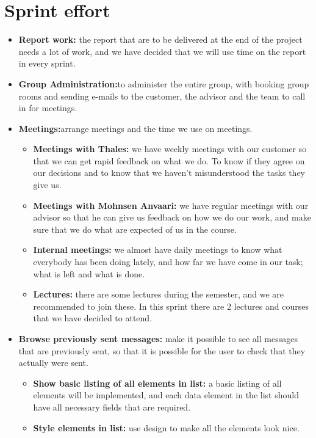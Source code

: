 \section{Sprint effort}

\begin{itemize}
\item{}\textbf{Report work:} the report that are to be delivered at the end of the project needs a lot of work, and we have decided that we will use time on the report in every sprint.
\item{}\textbf{Group Administration:}to administer the entire group, with booking group rooms and sending e-mails to the customer, the advisor and the team to call in for meetings.
\item{}\textbf{Meetings:}arrange meetings and the time we use on meetings.
\begin{itemize}
\item{}\textbf{Meetings with Thales:} we have weekly meetings with our customer so that we can get rapid feedback on what we do. To know if they agree on our decisions and to know that we haven’t misunderstood the tasks they give us.
\item{}\textbf{Meetings with Mohnsen Anvaari:} we have regular meetings with our advisor so that he can give us feedback on how we do our work, and make sure that we do what are expected of us in the course.
\item{}\textbf{Internal meetings:} we almost have daily meetings to know what everybody has been doing lately, and how far we have come in our task; what is left and what is done.
\item{}\textbf{Lectures:} there are some lectures during the semester, and we are recommended to join these. In this sprint there are 2 lectures and courses that we have decided to attend.
\end{itemize}
\item{}\textbf{Browse previously sent messages:} make it possible to see all messages that are previously sent, so that it is possible for the user to check that they actually were sent.
\begin{itemize}
\item{}\textbf{Show basic listing of all elements in list:} a basic listing of all elements will be implemented, and each data element in the list should have all necessary fields that are required.
\item{}\textbf{Style elements in list:} use design to make all the elements look nice.
\end{itemize}

\end{itemize}
